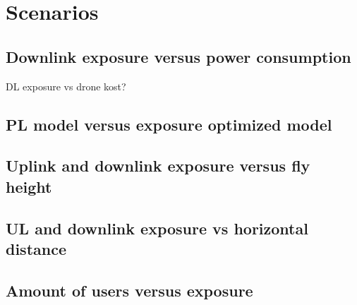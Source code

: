\chapter{Scenarios}
\label{chap:scenarios}

\section{Downlink exposure versus power consumption}
\label{sec:dlexpvspc}
DL exposure vs drone kost?

\section{PL model versus exposure optimized model}
\label{sec:modelcomparison}


\section{Uplink and downlink exposure versus fly height}
\label{sec:expvsflyheight}

\section{UL and downlink exposure vs horizontal distance}
\label{sec:sarvsexp}

\section{Amount of users versus exposure}
\label{sec:dlexpvspc}


